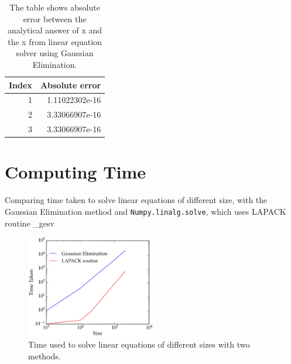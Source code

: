 \documentclass[11pt,letterpaper]{article}
\begin{document}
\begin{table}[h!]
	\centering
	\begin{tabular}{| r | r |}
		Index & Absolute error \\
		\hline
		\hline
		1 & 1.11022302e-16 \\
		2 & 3.33066907e-16 \\
		3 & 3.33066907e-16 \\
		\hline
	\end{tabular}
	\caption{The table shows absolute error between the analytical answer of x and the x from linear equation solver using Gaussian Elimination.}
	\label{tab:GaussError}
\end{table}

\section{Computing Time}
Comparing time taken to solve linear equations of different size, with the Gaussian Elimination method and \texttt{Numpy.linalg.solve}, which uses LAPACK routine \_gesv

\begin{figure}[h!]
	\centering
	\includegraphics[width=0.5\textwidth]{TimeTaken}
	\caption{Time used to solve linear equations of different sizes with two methods.}
	\label{fig:TimeTaken}
\end{figure}
\end{document}
